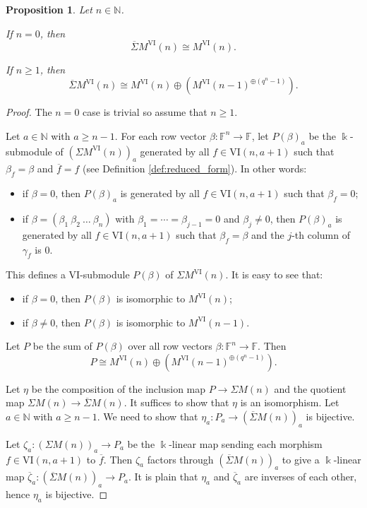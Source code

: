 \documentclass[10pt,a4paper]{amsart}
\newtheorem{proposition}{Proposition}
\newcommand{\F}{{\mathbb{F}}}
\newcommand{\N}{{\mathbb{N}}}
\newcommand{\SSigma}{{\overline{\Sigma}}}
\newcommand{\VI}{{\mathrm{VI}}}
\begin{document}
\begin{proposition} \label{prop:barshift1}
   Let $n\in \N$. 
   
   If $n=0$, then 
   \[ \SSigma M^{\VI}(n) \cong M^{\VI}(n). \]    
   
   If $n\geqslant 1$, then 
   \[ \SSigma M^{\VI}(n) \cong M^{\VI}(n) \oplus \left( M^{\VI}(n-1)^{\oplus (q^n-1)} \right). \]
\end{proposition}

\begin{proof}
   The $n=0$ case is trivial so assume that $n\geqslant 1$. 

   Let $a\in \N$ with $a\geqslant n-1$. For each row vector $\beta: \F^n \to \F$, let $P(\beta)_a$ be the $\Bbbk$-submodule of $(\Sigma M^{\VI}(n))_a$ generated by all $f\in \VI(n,a+1)$ such that $\beta_f=\beta$ and $\overline{f}=f$ (see Definition \ref{def:reduced_form}). In other words:
   \begin{itemize}
      \item if $\beta=0$, then $P(\beta)_a$ is generated by all $f\in \VI(n,a+1)$ such that $\beta_f=0$;
      \item if $\beta=(\beta_1 \ \beta_2 \ \ldots \ \beta_n)$ with $\beta_1=\cdots=\beta_{j-1}=0$ and $\beta_j\neq 0$, then $P(\beta)_a$ is generated by all $f\in \VI(n,a+1)$ such that $\beta_f=\beta$ and the $j$-th column of $\gamma_f$ is $0$.
   \end{itemize}    
   This defines a $\VI$-submodule $P(\beta)$ of $\Sigma M^{\VI}(n)$. It is easy to see that:
   \begin{itemize}
      \item if $\beta=0$, then $P(\beta)$ is isomorphic to $M^{\VI}(n)$;
      \item if $\beta\neq 0$, then $P(\beta)$ is isomorphic to $M^{\VI}(n-1)$.
   \end{itemize} 
   Let $P$ be the sum of $P(\beta)$ over all row vectors $\beta: \F^n \to \F$. Then 
   \[ P \cong M^{\VI}(n) \oplus \left( M^{\VI}(n-1)^{\oplus (q^n-1)} \right). \] 
   
   Let $\eta$ be the composition of the inclusion map $P\to \Sigma M(n)$ and the quotient map $\Sigma M(n) \to \SSigma M(n)$. It suffices to show that $\eta$ is an isomorphism. Let $a\in \N$ with $a\geqslant n-1$. We need to show that $\eta_a : P_a \to (\SSigma M(n))_a$ is bijective. 

   Let $\zeta_a: (\Sigma M(n))_a \to P_a$ be the $\Bbbk$-linear map sending each morphism $f\in \VI(n,a+1)$ to $\overline{f}$. Then $\zeta_a$ factors through $(\SSigma M(n))_a$ to give a $\Bbbk$-linear map $\overline{\zeta}_a: (\SSigma M(n))_a \to P_a$. It is plain that $\eta_a$ and $\overline{\zeta}_a$ are inverses of each other, hence $\eta_a$ is bijective.
\end{proof}
\end{document}
